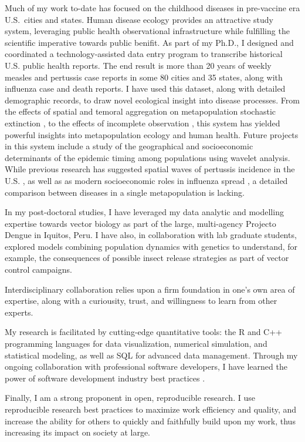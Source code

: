 \documentclass[12pt]{article}
\begin{document}
Much of my work to-date has focused on the childhood diseases 
in pre-vaccine era U.S.\ cities and 
states.  Human disease ecology provides an 
attractive study system, 
leveraging public health observational 
infrastructure while 
fulfilling the scientific imperative towards public benifit.
As part of my Ph.D., I designed and coordinated a technology-assisted
data entry program to transcribe historical U.S. 
public health reports. The end result is more than 
20 years of weekly measles and
pertussis case reports in some 80 cities and 35 
states, along with influenza case and death reports.
I have used this dataset, along with detailed demographic records, to draw novel ecological insight into 
disease processes. From the 
effects of spatial and temoral aggregation on metapopulation stochastic
extinction \citep{gunning2013probabilistic}, to the 
effects of incomplete
observation \citep{gunning2014conserved}, this system
has yielded powerful insights into metapopulation 
ecology and human health.
Future projects in this system include a study of 
the geographical and socioeconomic determinants of 
the epidemic timing among populations 
using wavelet analysis.  While previous research has 
suggested spatial waves of pertussis incidence 
in the U.S. \citep{choisy2012changing}, as well as 
as modern socioeconomic roles in influenza spread \citep{viboud2006synchrony}, a detailed
comparison between diseases in a single 
metapopulation is lacking.

In my post-doctoral studies, I have leveraged my 
data analytic and modelling expertise towards
vector biology as part of the large, multi-agency
Projecto Dengue in Iquitos, Peru. 
I have also, in collaboration with lab graduate
students, explored models
combining population dynamics with genetics to 
understand, for example, the consequences of 
possible insect release strategies as part of 
vector control campaigns.  





Interdisciplinary collaboration relies upon a firm
foundation in one's own area of expertise, along
with a curiousity, trust, and willingness to learn
from other experts.

My research is facilitated by cutting-edge quantitative tools:
the R and C++ programming languages for data visualization,
numerical simulation, and statistical modeling, as well as SQL for 
advanced data management. Through my ongoing 
collaboration with professional software developers,
I have learned the power of software
development industry best practices \citep{spolsky2000joel}.

Finally, I am a strong proponent in open, 
reproducible research. 
I use reproducible research best practices 
to maximize work efficiency and quality, and increase
the ability for others to quickly and faithfully 
build upon my work, thus increasing its impact
on society at large.
\end{document}
